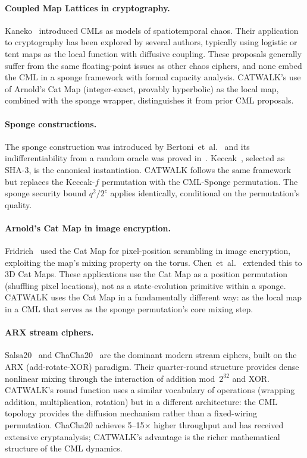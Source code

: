\documentclass[runningheads]{llncs}
\begin{document}
\paragraph{Coupled Map Lattices in cryptography.}
Kaneko~\cite{kaneko1984cml,kaneko1985cml} introduced CMLs as models of
spatiotemporal chaos.  Their application to cryptography has been explored
by several authors, typically using logistic or tent maps as the local function
with diffusive coupling.  These proposals generally suffer from the same
floating-point issues as other chaos ciphers, and none embed the CML in
a sponge framework with formal capacity analysis.  CATWALK's use of
Arnold's Cat Map (integer-exact, provably hyperbolic) as the local map,
combined with the sponge wrapper, distinguishes it from prior CML proposals.

\paragraph{Sponge constructions.}
The sponge construction was introduced by Bertoni~et~al.~\cite{bertoni2007sponge}
and its indifferentiability from a random oracle was proved
in~\cite{bertoni2008indifferentiability}.  Keccak~\cite{keccak2011}, selected
as SHA-3, is the canonical instantiation.  CATWALK follows the same framework
but replaces the Keccak-$f$ permutation with the CML-Sponge permutation.
The sponge security bound $q^2/2^c$ applies identically, conditional on the
permutation's quality.

\paragraph{Arnold's Cat Map in image encryption.}
Fridrich~\cite{fridrich1998symmetric} used the Cat Map for pixel-position
scrambling in image encryption, exploiting the map's mixing property on the
torus.  Chen~et~al.~\cite{chen2004symmetric} extended this to 3D Cat Maps.
These applications use the Cat Map as a position permutation (shuffling pixel
locations), not as a state-evolution primitive within a sponge.  CATWALK uses
the Cat Map in a fundamentally different way: as the local map in a CML that
serves as the sponge permutation's core mixing step.

\paragraph{ARX stream ciphers.}
Salsa20~\cite{bernstein2005salsa20} and ChaCha20~\cite{bernstein2008chacha}
are the dominant modern stream ciphers, built on the ARX (add-rotate-XOR)
paradigm.  Their quarter-round structure provides dense nonlinear mixing
through the interaction of addition mod~$2^{32}$ and XOR.  CATWALK's round
function uses a similar vocabulary of operations (wrapping addition,
multiplication, rotation) but in a different architecture: the CML topology
provides the diffusion mechanism rather than a fixed-wiring permutation.
ChaCha20 achieves 5--15$\times$ higher throughput and has received extensive
cryptanalysis; CATWALK's advantage is the richer mathematical structure
of the CML dynamics.
\end{document}
